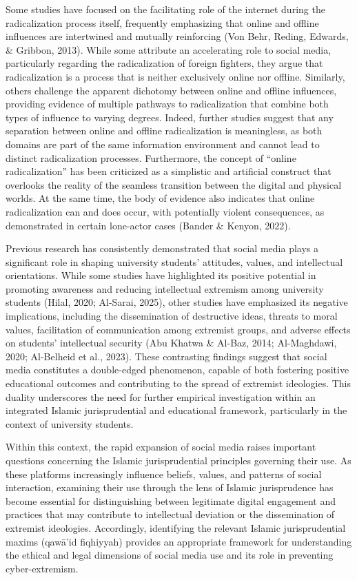 \documentclass[10pt]{NSP1}
\begin{document}
	Some studies have focused on the facilitating role of the internet during the radicalization process itself, frequently emphasizing that online and offline influences are intertwined and mutually reinforcing (Von Behr, Reding, Edwards, \& Gribbon, 2013). While some attribute an accelerating role to social media, particularly regarding the radicalization of foreign fighters, they argue that radicalization is a process that is neither exclusively online nor offline. Similarly, others challenge the apparent dichotomy between online and offline influences, providing evidence of multiple pathways to radicalization that combine both types of influence to varying degrees. Indeed, further studies suggest that any separation between online and offline radicalization is meaningless, as both domains are part of the same information environment and cannot lead to distinct radicalization processes. Furthermore, the concept of ``online radicalization'' has been criticized as a simplistic and artificial construct that overlooks the reality of the seamless transition between the digital and physical worlds. At the same time, the body of evidence also indicates that online radicalization can and does occur, with potentially violent consequences, as demonstrated in certain lone-actor cases (Bander \& Kenyon, 2022).
	
	Previous research has consistently demonstrated that social media plays a significant role in shaping university students' attitudes, values, and intellectual orientations. While some studies have highlighted its positive potential in promoting awareness and reducing intellectual extremism among university students (Hilal, 2020; Al-Sarai, 2025), other studies have emphasized its negative implications, including the dissemination of destructive ideas, threats to moral values, facilitation of communication among extremist groups, and adverse effects on students' intellectual security (Abu Khatwa \& Al-Baz, 2014; Al-Maghdawi, 2020; Al-Belheid et al., 2023). These contrasting findings suggest that social media constitutes a double-edged phenomenon, capable of both fostering positive educational outcomes and contributing to the spread of extremist ideologies. This duality underscores the need for further empirical investigation within an integrated Islamic jurisprudential and educational framework, particularly in the context of university students.
	
	Within this context, the rapid expansion of social media raises important questions concerning the Islamic jurisprudential principles governing their use. As these platforms increasingly influence beliefs, values, and patterns of social interaction, examining their use through the lens of Islamic jurisprudence has become essential for distinguishing between legitimate digital engagement and practices that may contribute to intellectual deviation or the dissemination of extremist ideologies. Accordingly, identifying the relevant Islamic jurisprudential maxims (qaw\={a}'id fiqhiyyah) provides an appropriate framework for understanding the ethical and legal dimensions of social media use and its role in preventing cyber-extremism.
	
\end{document}
